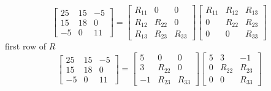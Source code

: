 \begin{example}
    \begin{equation}
\left[\begin{array}{rrr}
25 & 15 & -5 \\
15 & 18 & 0 \\
-5 & 0 & 11
\end{array}\right]=\left[\begin{array}{ccc}
R_{11} & 0 & 0 \\
R_{12} & R_{22} & 0 \\
R_{13} & R_{23} & R_{33}
\end{array}\right]\left[\begin{array}{ccc}
R_{11} & R_{12} & R_{13} \\
0 & R_{22} & R_{23} \\
0 & 0 & R_{33}
\end{array}\right]
\end{equation}
first row of $ R $
\begin{equation}
\left[\begin{array}{rrr}
25 & 15 & -5 \\
15 & 18 & 0 \\
-5 & 0 & 11
\end{array}\right]=\left[\begin{array}{rcc}
5 & 0 & 0 \\
3 & R_{22} & 0 \\
-1 & R_{23} & R_{33}
\end{array}\right]\left[\begin{array}{ccc}
5 & 3 & -1 \\
0 & R_{22} & R_{23} \\
0 & 0 & R_{33}
\end{array}\right]
\end{equation}


\end{example}
